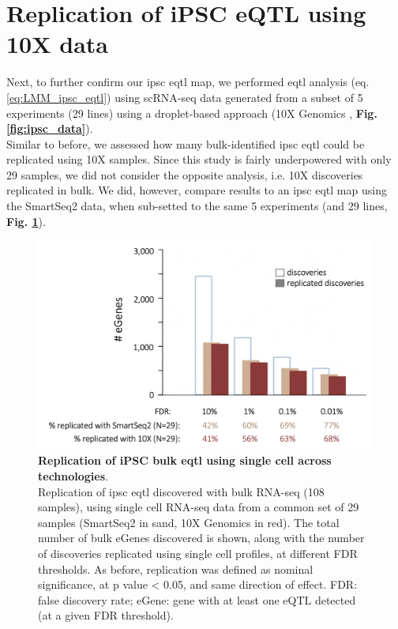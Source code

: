 \section{Replication of iPSC eQTL using 10X data}

Next, to further confirm our \gls{ipsc} \gls{eqtl} map, we performed \gls{eqtl} analysis (eq. \eqref{eq:LMM_ipsc_eqtl}) using scRNA-seq data generated from a subset of 5 experiments (29 lines) using a droplet-based approach (10X Genomics \cite{zheng2017massively}, \textbf{Fig. \ref{fig:ipsc_data}}).\\

Similar to before, we assessed how many bulk-identified \gls{ipsc} \gls{eqtl} could be replicated using 10X samples.
Since this study is fairly underpowered with only 29 samples, we did not consider the opposite analysis, i.e. 10X discoveries replicated in bulk.
We did, however, compare results to an \gls{ipsc} \gls{eqtl} map using the SmartSeq2 data, when sub-setted to the same 5 experiments (and 29 lines, \textbf{Fig. \ref{fig:sc_bulk_10x_egenes}}). 

\begin{figure}[h]
\includegraphics[width=14.5cm]{Chapter3/Fig/sc_vs_bulk_vs_10x.png}
\caption[iPSC bulk eQTL replication]{\textbf{Replication of iPSC bulk \gls{eqtl} using single cell across technologies}.\\
Replication of \gls{ipsc} \gls{eqtl} discovered with bulk RNA-seq (108 samples), using single cell RNA-seq data from a common set of 29 samples (SmartSeq2 in sand, 10X Genomics in red). 
The total number of bulk eGenes discovered is shown, along with the number of discoveries replicated using single cell profiles, at different FDR thresholds. 
As before, replication was defined as nominal significance, at p value < 0.05, and same direction of effect.
FDR: false discovery rate; eGene: gene with at least one eQTL detected (at a given FDR threshold).}
\label{fig:sc_bulk_10x_egenes}
\end{figure}

